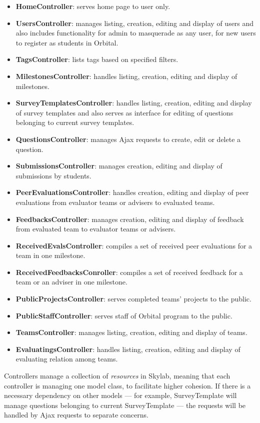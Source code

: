 \begin{itemize}
  \item \textbf{HomeController}: serves home page to user only.
  \item \textbf{UsersController}: manages listing, creation, editing and display of users and also includes functionality for admin to masquerade as any user, for new users to register as students in Orbital.
  \item \textbf{TagsController}: lists tags based on specified filters.
  \item \textbf{MilestonesController}: handles listing, creation, editing and display of milestones.
  \item \textbf{SurveyTemplatesController}: handles listing, creation, editing and display of survey templates and also serves as interface for editing of questions belonging to current survey templates. 
  \item \textbf{QuestionsController}: manages Ajax requests to create, edit or delete a question.
  \item \textbf{SubmissionsController}: manages creation, editing and display of submissions by students.
  \item \textbf{PeerEvaluationsController}: handles creation, editing and display of peer evaluations from evaluator teams or advisers to evaluated teams.
  \item \textbf{FeedbacksController}: manages creation, editing and display of feedback from evaluated team to evaluator teams or advisers.
  \item \textbf{ReceivedEvalsController}: compiles a set of received peer evaluations for a team in one milestone.
  \item \textbf{ReceivedFeedbacksConroller}: compiles a set of received feedback for a team or an adviser in one milestone.
  \item \textbf{PublicProjectsController}: serves completed teams' projects to the public.
  \item \textbf{PublicStaffController}: serves staff of Orbital program to the public.
  \item \textbf{TeamsController}: manages listing, creation, editing and display of teams.
  \item \textbf{EvaluatingsController}: handles listing, creation, editing and display of evaluating relation among teams.
\end{itemize}

Controllers manage a collection of \textit{resources} in Skylab, meaning that each controller is managing one model class, to facilitate higher cohesion. If there is a necessary dependency on other models --- for example, SurveyTemplate will manage questions belonging to current SurveyTemplate --- the requests will be handled by Ajax requests to separate concerns.

